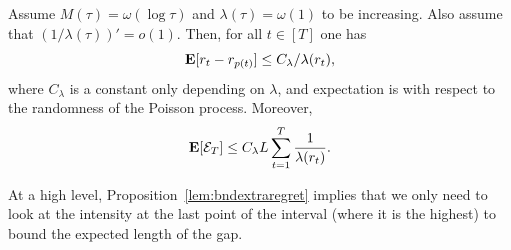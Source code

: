 \begin{proposition}\label{lem:bndextraregret}
    Assume $M(\tau) = \omega(\log \tau)$ and $\lambda(\tau) = \omega(1)$ to be increasing. Also assume that $(1/\lambda(\tau))' = o(1)$. Then, for all $t \in [T]$ one has
    \[
        \mathbf{E}[r_t - r_{p(t)}] \leq C_\lambda/\lambda(r_t),
    \]
    where $C_\lambda$ is a constant only depending on $\lambda$, and expectation is with respect to the randomness of the Poisson process. Moreover,
    \[
         \mathbf{E}[\mathcal{E}_T] \leq C_\lambda L\sum_{t=1}^T \frac{1}{\lambda(r_t)}.
    \]
\end{proposition}

At a high level, Proposition~\ref{lem:bndextraregret} implies that we only need to look at the intensity at the last point of the interval (where it is the highest) to bound the expected length of the gap.  

